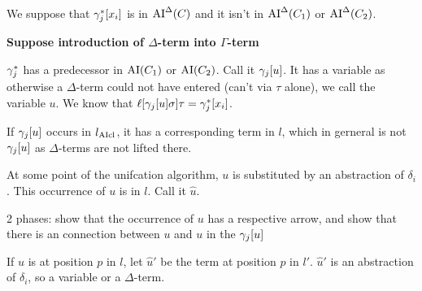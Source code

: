 \documentclass[,%
	paper=a4,%
	DIV12, %
	twoside=false,%
	liststotoc,
	bibtotoc,
	draft=false,%
	numbers=noendperiod
]{scrartcl}
\begin{document}
We suppose that $\gamma_j^*[x_i]$ is in $\operatorname{AI}^\Delta(C)$ and it isn't in $\operatorname{AI}^\Delta(C_1)$ or $\operatorname{AI}^\Delta(C_2)$.

{\bfseries Suppose introduction of $\Delta$-term into $\Gamma$-term}

$\gamma^*_j$ has a predecessor in $\operatorname{AI}(C_1)$ or $\operatorname{AI}(C_2)$. Call it $\gamma_j[u]$. It has a variable as otherwise a $\Delta$-term could not have entered (can't via $\tau$ alone), we call the variable $u$. We know that $\ell[\gamma_j[u] \sigma] \tau = \gamma^*_j[x_i]$.

If $\gamma_j[u]$ occurs in $l_{\operatorname{AIcl}}$, it has a corresponding term in $l$, which in gerneral is not $\gamma_j[u]$ as $\Delta$-terms are not lifted there.

At some point of the unifcation algorithm, $u$ is substituted by an abstraction of $\delta_i$.
This occurrence of $u$ is in $l$. Call it $\hat u$.

2 phases: show that the occurrence of $u$ has a respective arrow, and show that there is an connection between $u$ and $u$ in the $\gamma_j[u]$

If $\hat u$ is at position $p$ in $l$, let $\hat u'$ be the term at position $p$ in $l'$. $\hat u'$ is an abstraction of $\delta_i$, so a variable or a $\Delta$-term.
\end{document}
